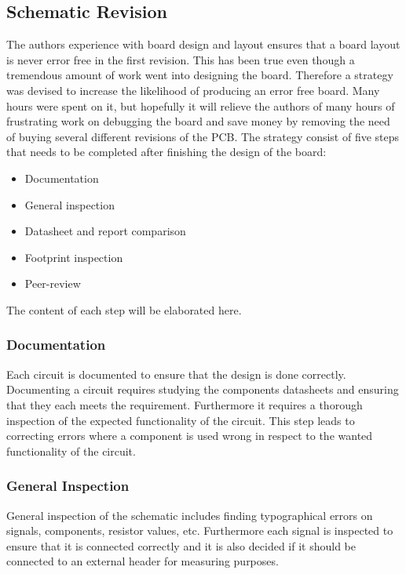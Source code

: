 \subsection{Schematic Revision} %
\label{sub:schematic_revision}

The authors experience with board design and layout ensures that a board layout is never error free in the first revision. 
This has been true even though a tremendous amount of work went into designing the board.
Therefore a strategy was devised to increase the likelihood of producing an error free board.
Many hours were spent on it, but hopefully it will relieve the authors of many hours of frustrating work on debugging the board and save money by removing the need of buying several different revisions of the PCB. 
The strategy consist of five steps that needs to be completed after finishing the design of the board:

\begin{itemize}
	\item Documentation
	\item General inspection
	\item Datasheet and report comparison
	\item Footprint inspection 
	\item Peer-review
\end{itemize}

The content of each step will be elaborated here. 

\subsubsection*{Documentation}
Each circuit is documented to ensure that the design is done correctly.
Documenting a circuit requires studying the components datasheets and ensuring that they each meets the requirement.
Furthermore it requires a thorough inspection of the expected functionality of the circuit.
This step leads to correcting errors where a component is used wrong in respect to the wanted functionality of the circuit.

\subsubsection*{General Inspection}
General inspection of the schematic includes finding typographical errors on signals, components, resistor values, etc.
Furthermore each signal is inspected to ensure that it is connected correctly and it is also decided if it should be connected to an external header for measuring purposes.

